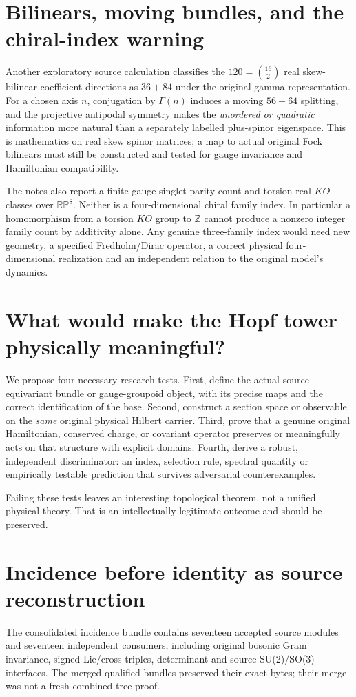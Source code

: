 \section{Bilinears, moving bundles, and the chiral-index warning}
Another exploratory source calculation classifies the
$120=\binom{16}{2}$ real skew-bilinear coefficient directions
as $36+84$ under the original gamma representation. For a chosen
axis $n$, conjugation by $\Gamma(n)$ induces a moving $56+64$
splitting, and the projective antipodal symmetry makes the
\emph{unordered or quadratic} information more natural than a
separately labelled plus-spinor eigenspace. This is mathematics on
real skew spinor matrices; a map to actual original Fock bilinears
must still be constructed and tested for gauge invariance and
Hamiltonian compatibility.

The notes also report a finite gauge-singlet parity count and
torsion real $KO$ classes over $\mathbb{RP}^8$. Neither is a
four-dimensional chiral family index. In particular a homomorphism
from a torsion $KO$ group to $\mathbb Z$ cannot produce a nonzero
integer family count by additivity alone. Any genuine three-family
index would need new geometry, a specified Fredholm/Dirac operator,
a correct physical four-dimensional realization and an independent
relation to the original model's dynamics.

\section{What would make the Hopf tower physically meaningful?}
We propose four necessary research tests. First, define the
actual source-equivariant bundle or gauge-groupoid object, with
its precise maps and the correct identification of the base.
Second, construct a section space or observable on the \emph{same}
original physical Hilbert carrier. Third, prove that a genuine
original Hamiltonian, conserved charge, or covariant operator
preserves or meaningfully acts on that structure with explicit
domains. Fourth, derive a robust, independent discriminator: an
index, selection rule, spectral quantity or empirically testable
prediction that survives adversarial counterexamples.

Failing these tests leaves an interesting topological theorem, not a
unified physical theory. That is an intellectually legitimate
outcome and should be preserved.

\section{Incidence before identity as source reconstruction}
\label{sec:ed08-incidence}
The consolidated incidence bundle contains seventeen accepted source
modules and seventeen independent consumers, including original
bosonic Gram invariance, signed Lie/cross triples, determinant and
source SU(2)/SO(3) interfaces. The merged qualified bundles preserved
their exact bytes; their merge was not a fresh combined-tree proof.

